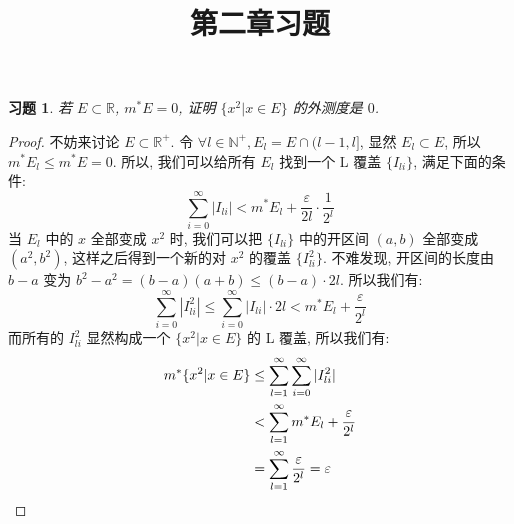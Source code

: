 \documentclass{article}
\title{第二章习题}
\date{}
\newtheorem{exercise}{习题}
\begin{document}
\maketitle

\begin{exercise}
  若 $E\subset \mathbb{R}$, $m^*E = 0$, 证明 $\{x^2|x\in E\}$ 的外测度是 $0$.
\end{exercise}
\begin{proof}
  不妨来讨论 $E\subset \mathbb{R}^+$. 令 $\forall l\in \mathbb{N}^+, E_l = E\cap (l-1, l]$, 显然 $E_l \subset E$, 所以 $m^* E_l \leq m^* E = 0$. 所以, 我们可以给所有 $E_l$ 找到一个 L 覆盖 $\{I_{li}\}$, 满足下面的条件:
  \[\sum_{i = 0}^\infty |I_{li}| < m^* E_l + \frac{\varepsilon}{2l}\cdot \frac{1}{2^l}\]
  当 $E_l$ 中的 $x$ 全部变成 $x^2$ 时, 我们可以把 $\{I_{li}\}$ 中的开区间 $(a, b)$ 全部变成 $(a^2, b^2)$, 这样之后得到一个新的对 $x^2$ 的覆盖 $\{I_{li}^2\}$. 不难发现,
  开区间的长度由 $b - a$ 变为 $b^2 - a^2 = (b - a) (a + b) \leq (b - a) \cdot 2l$.
  所以我们有:
  \[\sum_{i=0}^\infty |I_{li}^2| \leq \sum_{i=0}^\infty |I_{li}| \cdot 2l < m^*E_l + \frac{\varepsilon}{2^l}\]
  而所有的 $I_{li}^2$ 显然构成一个 $\{x^2 | x\in E\}$ 的 L 覆盖, 所以我们有:
  \begin{align*}
    m^* \{x^2|x\in E\} &\leq \sum_{l=1}^\infty \sum_{i=0}^\infty |I_{li}^2| \\
    &< \sum_{l=1}^\infty m^* E_l + \frac{\varepsilon}{2^l} \\
    &= \sum_{l=1}^\infty \frac{\varepsilon}{2^l} = \varepsilon \qedhere
  \end{align*}
\end{proof}
\end{document}
